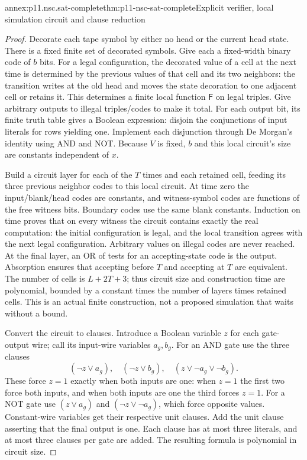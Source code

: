 \begin{annexitem}{annex:p11.nsc.sat-complete}{thm:p11-nsc-sat-complete}{Explicit verifier, local simulation circuit and clause reduction}
\begin{proof}
Decorate each tape symbol by either no head or the current head state.
There is a fixed finite set of decorated symbols. Give each a fixed-width
binary code of \(b\) bits. For a legal configuration, the decorated value
of a cell at the next time is determined by the previous values of that cell
and its two neighbors: the transition writes at the old head and moves
the state decoration to one adjacent cell or retains it. This determines
a finite local function \(\mathsf F\) on legal triples. Give arbitrary
outputs to illegal triples/codes to make it total. For each output bit,
its finite truth table gives a Boolean expression: disjoin the conjunctions
of input literals for rows yielding one. Implement each disjunction through
De Morgan's identity using AND and NOT. Because \(V\) is fixed, \(b\)
and this local circuit's size are constants independent of \(x\).

Build a circuit layer for each of the \(T\) times and each retained cell,
feeding its three previous neighbor codes to this local circuit. At time
zero the input/blank/head codes are constants, and witness-symbol codes
are functions of the free witness bits. Boundary codes use the same blank
constants. Induction on time proves that on every witness the circuit
contains exactly the real computation: the initial configuration is legal,
and the local transition agrees with the next legal configuration.
Arbitrary values on illegal codes are never reached. At the final layer,
an OR of tests for an accepting-state code is the output. Absorption ensures
that accepting before \(T\) and accepting at \(T\) are equivalent.
The number of cells is \(L+2T+3\); thus circuit size and construction
time are polynomial, bounded by a constant times the number of layers
times retained cells. This is an actual finite construction, not a proposed
simulation that waits without a bound.

Convert the circuit to clauses. Introduce a Boolean variable \(z\) for
each gate-output wire; call its input-wire variables \(a_g,b_g\).
For an AND gate use the three clauses
\[
 (\neg z\lor a_g),\quad(\neg z\lor b_g),\quad
 (z\lor\neg a_g\lor\neg b_g).
\]
These force \(z=1\) exactly when both inputs are one: when \(z=1\)
the first two force both inputs, and when both inputs are one the third
forces \(z=1\). For a NOT gate use
\((z\lor a_g)\) and \((\neg z\lor\neg a_g)\), which force opposite
values. Constant-wire variables get their respective unit clauses.
Add the unit clause asserting that the final output is one. Each clause
has at most three literals, and at most three clauses per gate are added.
The resulting formula is polynomial in circuit size.


\end{proof}
\end{annexitem}
